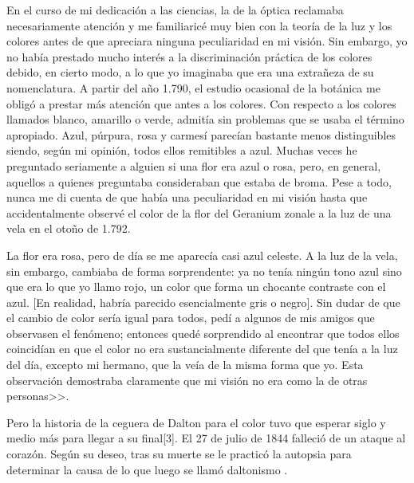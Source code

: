 \documentclass[10pt]{article}
\begin{document}
\setlength{\parskip}{2mm}

En el curso de mi dedicación a las ciencias, la de la óptica reclamaba necesariamente atención y me familiaricé muy bien con la teoría de la luz y los colores antes de que apreciara ninguna peculiaridad en mi visión. Sin embargo, yo no había prestado mucho interés a la discriminación práctica de los colores debido, en cierto modo, a lo que yo imaginaba que era una extrañeza de su nomenclatura. A partir del año 1.790, el estudio ocasional de la botánica me obligó a prestar más atención que antes a los colores. Con respecto a los colores llamados blanco, amarillo o verde, admitía sin problemas que se usaba el término apropiado. Azul, púrpura, rosa y carmesí parecían bastante menos distinguibles siendo, según mi opinión, todos ellos remitibles a azul. Muchas veces he preguntado seriamente a alguien si una flor era azul o rosa, pero, en general, aquellos a quienes preguntaba consideraban que estaba de broma. Pese a todo, nunca me di cuenta de que había una peculiaridad en mi visión hasta que accidentalmente observé el color de la flor del Geranium zonale a la luz de una vela en el otoño de 1.792.

\setlength{\parskip}{2mm}

La flor era rosa, pero de día se me aparecía casi azul celeste. A la luz de la vela, sin embargo, cambiaba de forma sorprendente: ya no tenía ningún tono azul sino que era lo que yo llamo rojo, un color que forma un chocante contraste con el azul. [En realidad, habría parecido esencialmente gris o negro]. Sin dudar de que el cambio de color sería igual para todos, pedí a algunos de mis amigos que observasen el fenómeno; entonces quedé sorprendido al encontrar que todos ellos coincidían en que el color no era sustancialmente diferente del que tenía a la luz del día, excepto mi hermano, que la veía de la misma forma que yo. Esta observación demostraba claramente que mi visión no era como la de otras personas>>\cite{IEEEreferencias:Ref3}.

\setlength{\parskip}{2mm}

Pero la historia de la ceguera de Dalton para el color tuvo que esperar siglo y medio más para llegar a su final[3]. 
El 27 de julio de 1844 falleció de un ataque al corazón. Según su deseo, tras su muerte se le practicó la autopsia para determinar la causa de lo que luego se llamó daltonismo \cite{IEEEreferencias:Ref1}.

\setlength{\parskip}{2mm}
\end{document}

